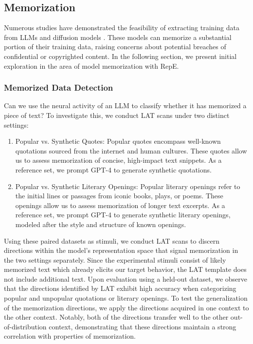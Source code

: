 \subsection{Memorization}\label{subsec:memorization}

Numerous studies have demonstrated the feasibility of extracting training data from LLMs and diffusion models \citep{carlini2021extracting, carlini2023extracting, hu2022membership}. These models can memorize a substantial portion of their training data, raising concerns about potential breaches of confidential or copyrighted content. In the following section, we present initial exploration in the area of model memorization with RepE.

\subsubsection{Memorized Data Detection}
Can we use the neural activity of an LLM to classify whether it has memorized a piece of text? To investigate this, we conduct LAT scans under two distinct settings:
\begin{enumerate}[leftmargin=*]
    \item Popular vs. Synthetic Quotes: Popular quotes encompass well-known quotations sourced from the internet and human cultures. These quotes allow us to assess memorization of concise, high-impact text snippets. As a reference set, we prompt GPT-4 to generate synthetic quotations.
    \item Popular vs. Synthetic Literary Openings: Popular literary openings refer to the initial lines or passages from iconic books, plays, or poems. These openings allow us to assess memorization of longer text excerpts. As a reference set, we prompt GPT-4 to generate synthetic literary openings, modeled after the style and structure of known openings.
\end{enumerate}
Using these paired datasets as stimuli, we conduct LAT scans to discern directions within the model's representation space that signal memorization in the two settings separately. Since the experimental stimuli consist of likely memorized text which already elicits our target behavior, the LAT template does not include additional text. Upon evaluation using a held-out dataset, we observe that the directions identified by LAT exhibit high accuracy when categorizing popular and unpopular quotations or literary openings. To test the generalization of the memorization directions, we apply the directions acquired in one context to the other context. Notably, both of the directions transfer well to the other out-of-distribution context, demonstrating that these directions maintain a strong correlation with properties of memorization.


